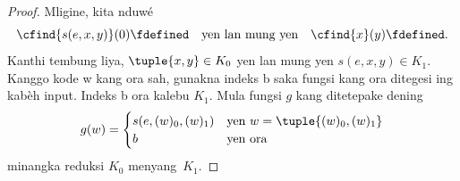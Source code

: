 \documentclass[../../../include/open-logic-section]{subfiles}
\begin{document}
\begin{proof}
Mligine, kita nduwé
\[
\cfind{s(e,x,y)}(0) \fdefined \quad \text{yen lan mung yen} \quad
\cfind{x}(y) \fdefined.
\]
Kanthi tembung liya, $\tuple{x, y} \in K_0$ yen lan mung yen $s(e,x,y) \in
K_1$. Kanggo kode w kang ora sah, gunakna indeks b saka fungsi kang ora ditegesi ing kabèh input. Indeks b ora kalebu $K_1$. Mula fungsi $g$ kang ditetepake dening
\[
g(w) = \begin{cases}s(e,(w)_0,(w)_1) & \text{yen }w=\tuple{(w)_0,(w)_1}\\b & \text{yen ora}\end{cases}
\]
minangka reduksi $K_0$ menyang~$K_1$.
\end{proof}
\end{document}
